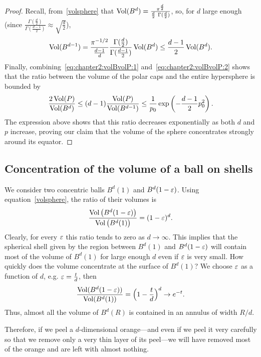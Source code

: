 \begin{proof}
Recall, from~\eqref{volsphere} that $\operatorname{Vol}(B^{d}) = \frac{\pi^{\frac{d}{2}} }{\frac{d}{2}\ \Gamma(\frac{d}{2})}$, so, for $d$ large enough (since $\frac{\Gamma(\frac{d}{2})}{\Gamma(\frac{d-1}{2})} \approx \sqrt{\frac{d}2}$),
\begin{equation}\label{eq:chapter2:volBvolP:2}
\operatorname{Vol}(B^{d-1}) = \frac{\pi^{-1/2}}{\frac{d-1}{d}} \frac{\Gamma(\frac{d}{2})}{\Gamma(\frac{d-1}{2})}\operatorname{Vol}(B^{d}) \leq \frac{d-1}2\operatorname{Vol}(B^{d}).
\end{equation}
Finally, combining~\eqref{eq:chapter2:volBvolP:1} and~\eqref{eq:chapter2:volBvolP:2} shows that the ratio between the volume of the polar caps and the entire hypersphere is bounded by
$$\frac{2 \operatorname{Vol}(P)}{\operatorname{Vol}(B^{d})} \le (d-1)\frac{ \operatorname{Vol}(P)}{\operatorname{Vol}(B^{d-1})} \le \frac{1}{p_0}\exp\left(-\frac{d-1}{2}p_0^2\right).$$
The expression above shows that this ratio decreases exponentially as both $d$ and $p$
increase, proving our claim that the volume of the sphere concentrates strongly around its equator.

\end{proof}


\subsection{Concentration of the volume of a ball on shells}

We consider two concentric balls $B^d(1)$ and $B^d(1-\varepsilon)$. Using equation~\eqref{volsphere}, the ratio of their volumes is
\begin{align}
\frac{\operatorname{Vol}\big(B^d(1-\varepsilon)\big)}{\operatorname{Vol}\big(B^d(1)\big)} = (1-\varepsilon)^d.
\end{align}
Clearly, for every $\varepsilon$ this ratio tends to zero as $d \to \infty$. This implies that the spherical shell given by the region between $B^d(1)$ and $B^d(1-\varepsilon)$ will contain most of the volume of $B^d(1)$  for large enough $d$ even if $\varepsilon$ is very small. How quickly does the volume concentrate at the surface of $B^d(1)$? We choose $\varepsilon$ as a function of $d$, e.g. $\varepsilon = \frac{t}{d}$, then
\[
\frac{\operatorname{Vol}(B^d(1-\varepsilon))}{\operatorname{Vol}(B^d(1))} = \Big(1-\frac{t}{d}\Big)^d \to e^{-t}.
\]
Thus, almost all the volume of $B^d(R)$ is contained in an annulus of width $R/d$.

Therefore, if we peel a $d$-dimensional orange---and even if we peel it very carefully so that we remove only a very thin layer of its peel---we will have removed most of the orange and are left with almost nothing.






